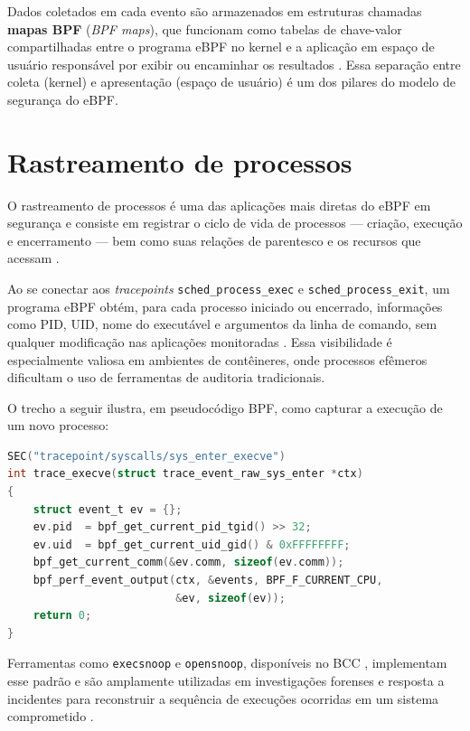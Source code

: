 Dados coletados em cada evento são armazenados em estruturas chamadas
\textbf{mapas BPF} (\textit{BPF maps}), que funcionam como tabelas de chave-valor
compartilhadas entre o programa eBPF no kernel e a aplicação em espaço de usuário
responsável por exibir ou encaminhar os resultados \cite{linuxkernel2024}.
Essa separação entre coleta (kernel) e apresentação (espaço de usuário) é um dos
pilares do modelo de segurança do eBPF.

\section{Rastreamento de processos}

O rastreamento de processos é uma das aplicações mais diretas do eBPF em segurança
e consiste em registrar o ciclo de vida de processos — criação, execução e
encerramento — bem como suas relações de parentesco e os recursos que acessam
\cite{gregg2019}.

Ao se conectar aos \textit{tracepoints} \texttt{sched\_process\_exec} e
\texttt{sched\_process\_exit}, um programa eBPF obtém, para cada processo iniciado
ou encerrado, informações como PID, UID, nome do executável e argumentos da linha de
comando, sem qualquer modificação nas aplicações monitoradas \cite{linuxkernel2024}.
Essa visibilidade é especialmente valiosa em ambientes de contêineres, onde processos
efêmeros dificultam o uso de ferramentas de auditoria tradicionais.

O trecho a seguir ilustra, em pseudocódigo BPF, como capturar a execução de um novo
processo:

\begin{lstlisting}[language=C, caption={Captura de evento de execução de processo via tracepoint.}]
SEC("tracepoint/syscalls/sys_enter_execve")
int trace_execve(struct trace_event_raw_sys_enter *ctx)
{
    struct event_t ev = {};
    ev.pid  = bpf_get_current_pid_tgid() >> 32;
    ev.uid  = bpf_get_current_uid_gid() & 0xFFFFFFFF;
    bpf_get_current_comm(&ev.comm, sizeof(ev.comm));
    bpf_perf_event_output(ctx, &events, BPF_F_CURRENT_CPU,
                          &ev, sizeof(ev));
    return 0;
}
\end{lstlisting}

Ferramentas como \texttt{execsnoop} e \texttt{opensnoop}, disponíveis no BCC
\cite{bcc}, implementam esse padrão e são amplamente utilizadas em investigações
forenses e resposta a incidentes para reconstruir a sequência de execuções ocorridas
em um sistema comprometido \cite{majors2022}.

